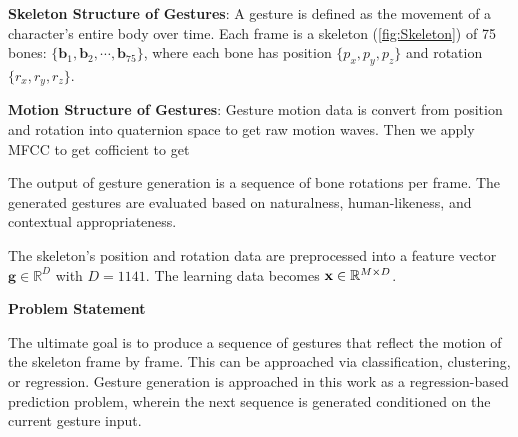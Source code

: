 \textbf{Skeleton Structure of Gestures}: A gesture is defined as the movement of a character's entire body over time.
Each frame is a skeleton (\autoref{fig:Skeleton}) of 75 bones: $\{ \mathbf{b}_{1}, \mathbf{b}_{2}, \cdots , \mathbf{b}_{75} \}$, where each bone has position $\{ p_{x}, p_{y}, p_{z} \}$ and rotation $\{ r_{x}, r_{y}, r_{z} \}$.



\textbf{Motion Structure of Gestures}: Gesture motion data is convert from position and rotation into quaternion space to get raw motion waves. Then we apply MFCC to get cofficient to get 


The output of gesture generation is a sequence of bone rotations per frame. The generated gestures are evaluated based on naturalness, human-likeness, and contextual appropriateness.

The skeleton's position and rotation data are preprocessed into a feature vector $\mathbf{g} \in \mathbb{R}^{D}$ with $D = 1141$. The learning data becomes $\mathbf{x} \in \mathbb{R}^{M \times D}$. 

\textbf{Problem Statement}

The ultimate goal is to produce a sequence of gestures that reflect the motion of the skeleton frame by frame. This can be approached via classification, clustering, or regression. Gesture generation is approached in this work as a regression-based prediction problem, wherein the next sequence is generated conditioned on the current gesture input.


